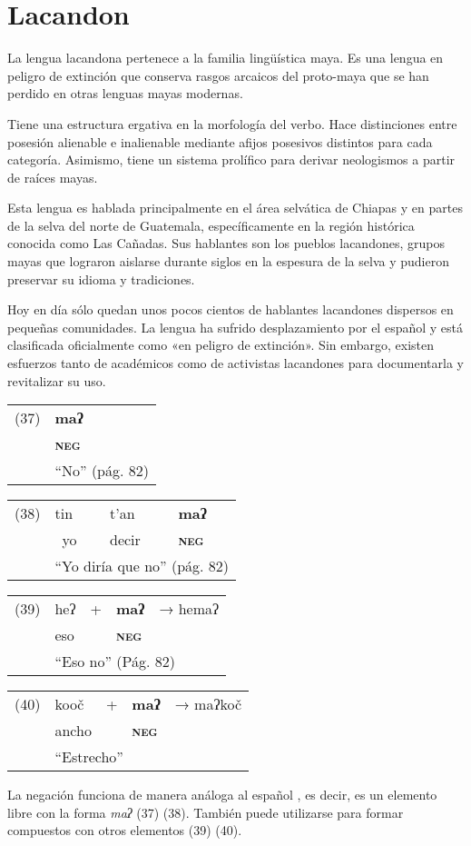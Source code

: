 \section*{Lacandon}

\noindent La lengua lacandona pertenece a la familia lingüística maya. Es una lengua en peligro de extinción que conserva rasgos arcaicos del proto-maya que se han perdido en otras lenguas mayas modernas.

 Tiene una estructura ergativa en la morfología del verbo. Hace distinciones entre posesión alienable e inalienable mediante afijos posesivos distintos para cada categoría. Asimismo, tiene un sistema prolífico para derivar neologismos a partir de raíces mayas.

Esta lengua es hablada principalmente en el área selvática de Chiapas y en partes de la selva del norte de Guatemala, específicamente en la región histórica conocida como Las Cañadas. Sus hablantes son los pueblos lacandones, grupos mayas que lograron aislarse durante siglos en la espesura de la selva y pudieron preservar su idioma y tradiciones.

Hoy en día sólo quedan unos pocos cientos de hablantes lacandones dispersos en pequeñas comunidades. La lengua ha sufrido desplazamiento por el español y está clasificada oficialmente como «en peligro de extinción». Sin embargo, existen esfuerzos tanto de académicos como de activistas lacandones para documentarla y revitalizar su uso. \vspace{0.5cm}

{\setmainfont{Charis SIL} 
\begin{tabular}{ll}
(37) & \textbf{maʔ}  \\
& \textsc{\textbf{neg}} \\
& ``No'' (pág. 82)
\end{tabular} \vspace{0.5cm}

\begin{tabular}{llll}
(38) & tin & t'an & \textbf{maʔ} \\
& \ yo & decir & \textsc{\textbf{neg}} \\
& \multicolumn{3}{l}{``Yo diría que no'' (pág. 82)}
\end{tabular} \vspace{0.5cm}

\begin{tabular}{lllll}
(39) & heʔ & + & \textbf{maʔ} & → hemaʔ \\
& eso & & \textsc{\textbf{neg}} & \\
& \multicolumn{4}{l}{``Eso no'' (Pág. 82)}
\end{tabular} \vspace{0.5cm}

\begin{tabular}{lllll}
(40) & kooč & + & \textbf{maʔ} & → maʔkoč \\
& ancho & & \textsc{\textbf{neg}} & \\
& \multicolumn{4}{l}{``Estrecho''}
\end{tabular} \vspace{0.5cm}
}

La negación funciona de manera análoga al español \textcolor{MidnightBlue}{\citep{lacandon}}, es decir, es un elemento libre con la forma {\setmainfont{Charis SIL} \textit{maʔ}} (37) (38). También puede utilizarse para formar compuestos con otros elementos (39) (40).